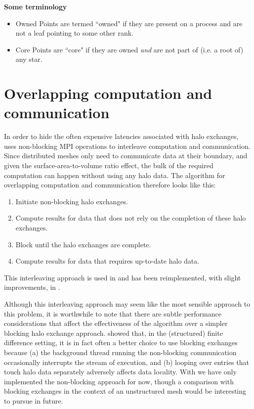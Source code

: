 \textbf{Some terminology}

\begin{itemize}
  \item Owned
    Points are termed ``owned" if they are present on a process and are not a leaf pointing to some other rank.
  \item Core
    Points are ``core" if they are owned \textit{and} are not part of (i.e. a root of) any star.
\end{itemize}


\section{Overlapping computation and communication}

In order to hide the often expensive latencies associated with halo exchanges,  uses non-blocking MPI operations to interleave computation and communication.
Since distributed meshes only need to communicate data at their boundary, and given the surface-area-to-volume ratio effect, the bulk of the required computation can happen without using any halo data.
The algorithm for overlapping computation and communication therefore looks like this:

\begin{enumerate}
  \item Initiate non-blocking halo exchanges.
  \item Compute results for data that does not rely on the completion of these halo exchanges.
  \item Block until the halo exchanges are complete.
  \item Compute results for data that requires up-to-date halo data.
\end{enumerate}

This interleaving approach is used in  and has been reimplemented, with slight improvements, in .

Although this interleaving approach may seem like the most sensible approach to this problem, it is worthwhile to note that there are subtle performance considerations that affect the effectiveness of the algorithm over a simpler blocking halo exchange approach.
\cite{bisbasAutomatedMPICode2023} showed that, in the (structured) finite difference setting, it is in fact often a better choice to use blocking exchanges because
(a) the background thread running the non-blocking communication occasionally interrupts the stream of execution, and
(b) looping over entries that touch halo data separately adversely affects data locality.
With  we have only implemented the non-blocking approach for now, though a comparison with blocking exchanges in the context of an unstructured mesh would be interesting to pursue in future.

